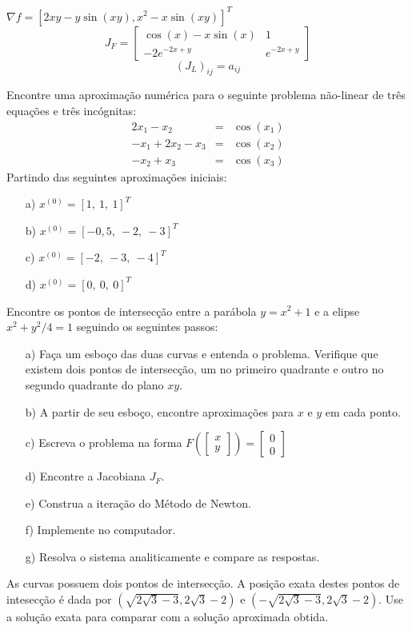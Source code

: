 \begin{resp}
$\nabla f = [2xy-y\sin(xy), x^2-x\sin(xy)]^T$
$$J_F=\left[\begin{array}{cc}
\cos(x)-x\sin(x) & 1\\
-2e^{-2x+y} &e^{-2x+y}
\end{array}
\right]$$
$$\left(J_L\right)_{ij}=a_{ij}$$
\end{resp}


\begin{exer} Encontre uma aproximação numérica para o seguinte problema não-linear de três equações e três incógnitas:
\begin{eqnarray*}
2x_1-x_2&=&\cos(x_1)\\
-x_1+2x_2-x_3&=&\cos(x_2)\\
-x_2+	x_3&=&\cos(x_3)
\end{eqnarray*}
Partindo das seguintes aproximações iniciais:
\begin{itemize}
\item[a)] $x^{(0)}=[1,~1,~1]^T$
\item[b)] $x^{(0)}=[-0,5,~-2,~-3]^T$
\item[c)] $x^{(0)}=[-2,~-3,~-4]^T$
\item[d)] $x^{(0)}=[0,~0,~0]^T$
\end{itemize}
\end{exer}



\begin{exer}\label{prob_para_elipse}
 Encontre os pontos de intersecção entre a parábola $y=x^2+1$ e a elipse $x^2+y^2/4=1$ seguindo os seguintes passos:
\begin{itemize}
\item[a)] Faça um esboço das duas curvas e entenda o problema. Verifique que existem dois pontos de intersecção, um no primeiro quadrante e outro no segundo quadrante do plano $xy$.
\item[b)] A partir de seu esboço, encontre aproximações para $x$ e $y$ em cada ponto.
\item[c)] Escreva o problema na forma $F\left(\left[\begin{array}{c}x\\y\end{array}\right]\right)=\left[\begin{array}{c}0\\0\end{array}\right]$
\item[d)] Encontre a Jacobiana $J_F$.
\item[e)] Construa a iteração do Método de Newton.
\item[f)] Implemente no computador.
\item[g)] Resolva o sistema analiticamente e compare as respostas.
\end{itemize}
\end{exer}
\begin{resp}
As curvas possuem dois pontos de intersecção. A posição exata destes pontos de intesecção é dada por $\left(\sqrt{2\sqrt{3}-3},2\sqrt{3}-2\right)$ e $\left(-\sqrt{2\sqrt{3}-3},2\sqrt{3}-2\right)$. Use a solução exata para comparar com a solução aproximada obtida.
\end{resp}

